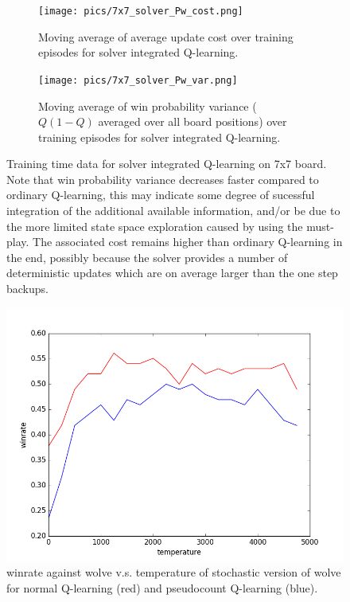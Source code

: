 \documentclass{article}
\begin{document}
\begin{figure}[!ht]
\centering
\begin{subfigure}[t]{.45\textwidth}
  \centering
      \texttt{[image: pics/7x7\_solver\_Pw\_cost.png]}
  \caption{Moving average of average update cost over training episodes for solver integrated Q-learning.}
  \label{fig:solver_cost}
\end{subfigure}\hfill
\begin{subfigure}[t]{.45\textwidth}
  \centering
      \texttt{[image: pics/7x7\_solver\_Pw\_var.png]}
  \caption{Moving average of win probability variance ($Q(1-Q)$ averaged over all board positions) over training episodes for solver integrated Q-learning.}
  \label{fig:solver_var}
\end{subfigure}
\caption{Training time data for solver integrated Q-learning on 7x7 board. Note that win probability variance decreases faster compared to ordinary Q-learning, this may indicate some degree of sucessful integration of the additional available information, and/or be due to the more limited state space exploration caused by using the must-play. The associated cost remains higher than ordinary Q-learning in the end, possibly because the solver provides a number of deterministic updates which are on average larger than the one step backups.}
\label{fig:solver}
\end{figure}

\begin{figure}[!ht]
\centering
\includegraphics[width=1\textwidth]{pics/wolve_temp.png}
\caption{winrate against wolve v.s. temperature of stochastic version of wolve for normal Q-learning (red) and pseudocount Q-learning (blue).}
\label{fig:wolve_temp}
\end{figure}
\end{document}
